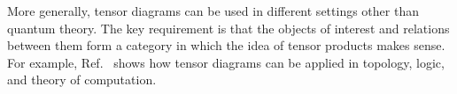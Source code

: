 

More generally, tensor diagrams can be used in different settings other than quantum theory. The key requirement is that the objects of interest and relations between them form a category in which the idea of tensor products makes sense. For example, Ref.~\cite{coecke_physics_2010} shows how tensor diagrams can be applied in topology, logic, and theory of computation.

